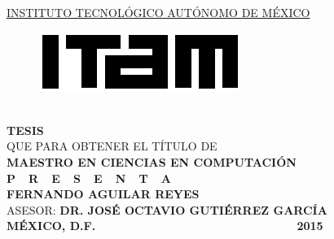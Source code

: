 \begin{titlepage}
\begin{center}

\textsc{\underline{INSTITUTO TECNOLÓGICO AUTÓNOMO DE MÉXICO}}\\[1.5cm] %

\begin{figure}[h]
\centering
\includegraphics[scale=2]{imagenes/logoitam.png}\\[0.5cm] %
\end{figure} 

\huge{\thesisTitle}\\[1.5cm] %


\large \textbf{TESIS}\\ QUE PARA OBTENER EL TÍTULO DE\\ \textbf{MAESTRO EN CIENCIAS EN COMPUTACIÓN}\\[0.8cm]
\large \textbf{P\ \  R\ \  E\ \  S\ \  E\ \  N\ \  T\ \  A}\\[0.8cm]

\textbf{FERNANDO AGUILAR REYES}\\[1.0cm]

\large ASESOR: \textbf{DR. JOSÉ OCTAVIO GUTIÉRREZ GARCÍA}\\[1.4cm]

\large \textbf{MÉXICO, D.F.} {\ \ \ \ \ \ \ \ \ \ \ \ \ \ \ \ \ \ \ \ \ \ \ \ \ \ \ \ \ \ \ \ \ \ } \textbf{2015}

\vfill
\end{center}

\end{titlepage}
